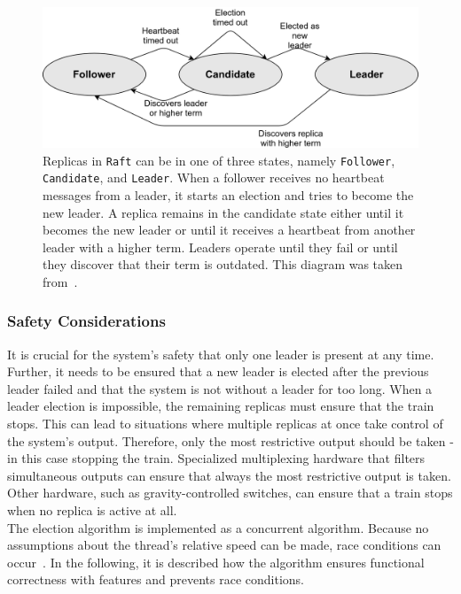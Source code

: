 \begin{figure}[!hb]
	\centering
	\includegraphics[width=0.75\linewidth]{images/RaftServerStates}
	\caption{Replicas in \texttt{Raft} can be in one of three states, namely \texttt{Follower}, \texttt{Candidate}, and \texttt{Leader}. When a follower receives no heartbeat messages from a leader, it starts an election and tries to become the new leader. A replica remains in the candidate state either until it becomes the new leader or until it receives a heartbeat from another leader with a higher term. Leaders operate until they fail or until they discover that their term is outdated. This diagram was taken from~\cite{RaftConsensusPaper}.}
	\label{fig:RaftServerStates}
\end{figure}


\subsubsection{Safety Considerations}
\label{subsub:raceConditions}

It is crucial for the system's safety that only one leader is present at any time.
Further, it needs to be ensured that a new leader is elected after the previous leader failed and that the system is not without a leader for too long.
When a leader election is impossible, the remaining replicas must ensure that the train stops.
This can lead to situations where multiple replicas at once take control of the system's output.
Therefore, only the most restrictive output should be taken - in this case stopping the train.
Specialized multiplexing hardware that filters simultaneous outputs can ensure that always the most restrictive output is taken.
Other hardware, such as gravity-controlled switches, can ensure that a train stops when no replica is active at all.
\\

\noindent
The election algorithm is implemented as a concurrent algorithm.
Because no assumptions about the thread's relative speed can be made, race conditions can occur~\cite{Dijkstra1965}.
In the following, it is described how the algorithm ensures functional correctness with  features and prevents race conditions.

